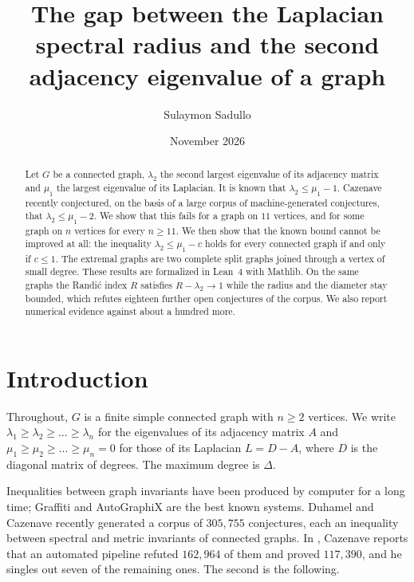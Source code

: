 \documentclass[11pt]{amsart}
\theoremstyle{definition}
\theoremstyle{remark}
\begin{document}
\title[Laplacian spectral radius and second adjacency eigenvalue]{The gap between the
Laplacian spectral radius and the second adjacency eigenvalue of a graph}

\author{Sulaymon Sadullo}

\date{November 2026}


\begin{abstract}
Let $G$ be a connected graph, $\lambda_2$ the second largest eigenvalue of its adjacency matrix
and $\mu_1$ the largest eigenvalue of its Laplacian. It is known that
$\lambda_2\le\mu_1-1$. Cazenave recently conjectured, on the basis of a large corpus of
machine-generated conjectures, that $\lambda_2\le\mu_1-2$. We show that this fails for a graph
on $11$ vertices, and for some graph on $n$ vertices for every $n\ge 11$. We then show that the
known bound cannot be improved at all: the inequality $\lambda_2\le\mu_1-c$ holds for every
connected graph if and only if $c\le 1$. The extremal graphs are two complete split graphs
joined through a vertex of small degree. These results are formalized in Lean~4 with Mathlib.
On the same graphs the Randi\'c index $R$ satisfies $R-\lambda_2\to 1$ while the radius and the
diameter stay bounded, which refutes eighteen further open conjectures of the corpus. We also
report numerical evidence against about a hundred more.
\end{abstract}

\maketitle

\section{Introduction}

Throughout, $G$ is a finite simple connected graph with $n\ge 2$ vertices. We write
$\lambda_1\ge\lambda_2\ge\dots\ge\lambda_n$ for the eigenvalues of its adjacency matrix $A$ and
$\mu_1\ge\mu_2\ge\dots\ge\mu_n=0$ for those of its Laplacian $L=D-A$, where $D$ is the diagonal
matrix of degrees. The maximum degree is $\Delta$.

Inequalities between graph invariants have been produced by computer for a long time; Graffiti
\cite{Fajtlowicz} and AutoGraphiX \cite{CaporossiHansen} are the best known systems. Duhamel and
Cazenave \cite{DuhamelCazenave} recently generated a corpus of $305{,}755$ conjectures, each an
inequality between spectral and metric invariants of connected graphs. In \cite{Cazenave},
Cazenave reports that an automated pipeline refuted $162{,}964$ of them and proved $117{,}390$,
and he singles out seven of the remaining ones. The second is the following.
\end{document}
